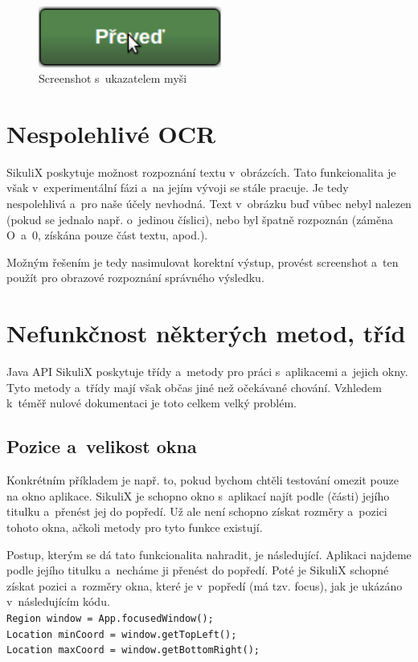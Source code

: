 	\begin{figure}[ht!]
		\centering
		\caption{Screenshot s~ukazatelem myši}
		\label{mys}
		\includegraphics[width=6cm]{img/Chyby/mys.png}
	\end{figure}
	
	\section{Nespolehlivé OCR}
	SikuliX poskytuje možnost rozpoznání textu v~obrázcích. Tato funkcionalita je však v~experimentální fázi a~na jejím vývoji se stále pracuje. Je tedy nespolehlivá a~pro naše účely nevhodná. Text v~obrázku buď vůbec nebyl nalezen (pokud se jednalo např. o~jedinou číslici), nebo byl špatně rozpoznán (záměna O~a~0, získána pouze část textu, apod.).
	
	Možným řešením je tedy nasimulovat korektní výstup, provést screenshot a~ten použít pro obrazové rozpoznání správného výsledku.
	
	\section{Nefunkčnost některých metod, tříd}\label{Problemy}
	Java API SikuliX poskytuje třídy a~metody pro práci s~aplikacemi a~jejich okny. Tyto metody a~třídy mají však občas jiné než očekávané chování. Vzhledem k~téměř nulové dokumentaci je toto celkem velký problém.

		\subsection{Pozice a~velikost okna}		
		Konkrétním příkladem je např. to, pokud bychom chtěli testování omezit pouze na okno aplikace. SikuliX je schopno okno s~aplikací najít podle (části) jejího titulku a~přenést jej do popředí. Už ale není schopno získat rozměry a~pozici tohoto okna, ačkoli metody pro tyto funkce existují.
	
		Postup, kterým se dá tato funkcionalita nahradit, je následující. Aplikaci najdeme podle jejího titulku a~necháme ji přenést do popředí. Poté je SikuliX schopné získat pozici a~rozměry okna, které je v~popředí (má tzv. focus), jak je ukázáno v~následujícím kódu.\\[0.2cm]
		\texttt{Region window = App.focusedWindow();\\
		Location minCoord = window.getTopLeft();\\
		Location maxCoord = window.getBottomRight();}
		
